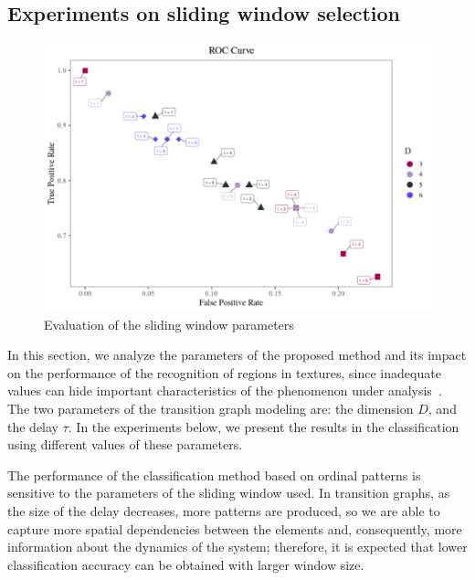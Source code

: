\documentclass[journal]{IEEEtran}
\begin{document}
\subsection{Experiments on sliding window selection}

\begin{figure}[!ht]
	\includegraphics[width=\columnwidth]{Figures/ROC.pdf}	\caption{Evaluation of the sliding window parameters}
	\label{fig:ROC}
\end{figure} 

In this section, we analyze the parameters of the proposed method and its impact on the performance of the recognition of regions in textures, since inadequate values can hide important characteristics of the phenomenon under analysis~\cite{mccullough2015time}.
The two parameters of the transition graph modeling are: the dimension $D$, and the delay $\tau$.
In the experiments below, we present the results in the classification using different values of these parameters.

The performance of the classification method based on ordinal patterns is sensitive to the parameters of the sliding window used.
In transition graphs, as the size of the delay decreases, more patterns are produced, so we are able to capture more spatial dependencies between the elements and, consequently, more information about the dynamics of the system; therefore, it is expected that lower classification accuracy can be obtained with larger window size. 
\end{document}
